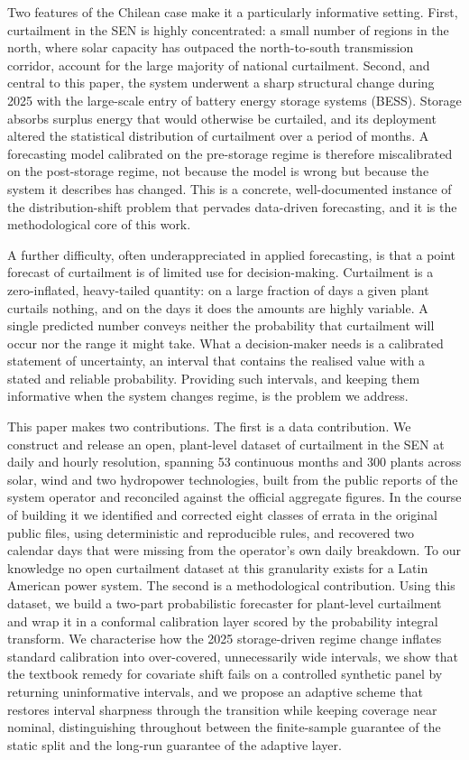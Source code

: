 \documentclass[preprint,3p,times]{elsarticle}
\begin{document}
Two features of the Chilean case make it a particularly informative setting. First, curtailment in the SEN is highly concentrated: a small number of regions in the north, where solar capacity has outpaced the north-to-south transmission corridor, account for the large majority of national curtailment. Second, and central to this paper, the system underwent a sharp structural change during 2025 with the large-scale entry of battery energy storage systems (BESS). Storage absorbs surplus energy that would otherwise be curtailed, and its deployment altered the statistical distribution of curtailment over a period of months. A forecasting model calibrated on the pre-storage regime is therefore miscalibrated on the post-storage regime, not because the model is wrong but because the system it describes has changed. This is a concrete, well-documented instance of the distribution-shift problem that pervades data-driven forecasting, and it is the methodological core of this work.

A further difficulty, often underappreciated in applied forecasting, is that a point forecast of curtailment is of limited use for decision-making. Curtailment is a zero-inflated, heavy-tailed quantity: on a large fraction of days a given plant curtails nothing, and on the days it does the amounts are highly variable. A single predicted number conveys neither the probability that curtailment will occur nor the range it might take. What a decision-maker needs is a calibrated statement of uncertainty, an interval that contains the realised value with a stated and reliable probability. Providing such intervals, and keeping them informative when the system changes regime, is the problem we address.

This paper makes two contributions. The first is a data contribution. We construct and release an open, plant-level dataset of curtailment in the SEN at daily and hourly resolution, spanning 53 continuous months and 300 plants across solar, wind and two hydropower technologies, built from the public reports of the system operator and reconciled against the official aggregate figures. In the course of building it we identified and corrected eight classes of errata in the original public files, using deterministic and reproducible rules, and recovered two calendar days that were missing from the operator's own daily breakdown. To our knowledge no open curtailment dataset at this granularity exists for a Latin American power system. The second is a methodological contribution. Using this dataset, we build a two-part probabilistic forecaster for plant-level curtailment and wrap it in a conformal calibration layer scored by the probability integral transform. We characterise how the 2025 storage-driven regime change inflates standard calibration into over-covered, unnecessarily wide intervals, we show that the textbook remedy for covariate shift fails on a controlled synthetic panel by returning uninformative intervals, and we propose an adaptive scheme that restores interval sharpness through the transition while keeping coverage near nominal, distinguishing throughout between the finite-sample guarantee of the static split and the long-run guarantee of the adaptive layer.
\end{document}
